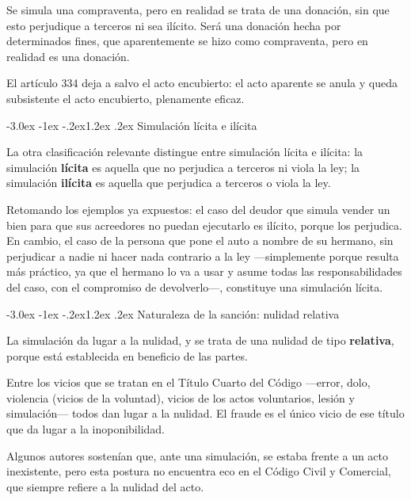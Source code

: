\documentclass[12pt,oneside]{book}
\makeatletter
\renewcommand\section{\@startsection{section}{1}{\z@}%
  {-3.0ex \@plus -1ex \@minus -.2ex}{1.2ex \@plus .2ex}%
  {\normalfont\large\bfseries\color{acento}}}
\makeatother
\begin{document}
\begin{ejemplo}
Se simula una compraventa, pero en realidad se trata de una donación, sin que esto perjudique a terceros ni sea ilícito. Será una donación hecha por determinados fines, que aparentemente se hizo como compraventa, pero en realidad es una donación.
\end{ejemplo}

El artículo 334 deja a salvo el acto encubierto: el acto aparente se anula y queda subsistente el acto encubierto, plenamente eficaz.

\section{Simulación lícita e ilícita}

La otra clasificación relevante distingue entre simulación lícita e ilícita: la simulación \textbf{lícita} es aquella que no perjudica a terceros ni viola la ley; la simulación \textbf{ilícita} es aquella que perjudica a terceros o viola la ley.

Retomando los ejemplos ya expuestos: el caso del deudor que simula vender un bien para que sus acreedores no puedan ejecutarlo es ilícito, porque los perjudica. En cambio, el caso de la persona que pone el auto a nombre de su hermano, sin perjudicar a nadie ni hacer nada contrario a la ley ---simplemente porque resulta más práctico, ya que el hermano lo va a usar y asume todas las responsabilidades del caso, con el compromiso de devolverlo---, constituye una simulación lícita.

\section{Naturaleza de la sanción: nulidad relativa}

La simulación da lugar a la nulidad, y se trata de una nulidad de tipo \textbf{relativa}, porque está establecida en beneficio de las partes.

Entre los vicios que se tratan en el Título Cuarto del Código ---error, dolo, violencia (vicios de la voluntad), vicios de los actos voluntarios, lesión y simulación--- todos dan lugar a la nulidad. El fraude es el único vicio de ese título que da lugar a la inoponibilidad.

Algunos autores sostenían que, ante una simulación, se estaba frente a un acto inexistente, pero esta postura no encuentra eco en el Código Civil y Comercial, que siempre refiere a la nulidad del acto.
\end{document}
